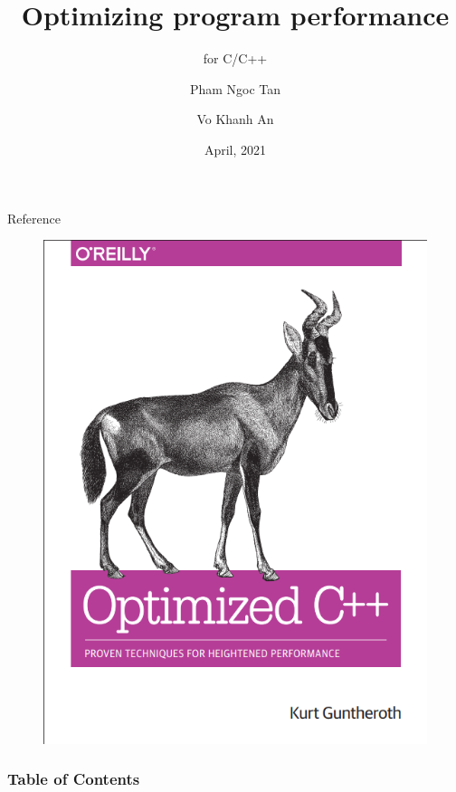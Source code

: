 \documentclass[aspectratio=169,xcolor=dvipsnames]{beamer}
\title[Optimizing C/C++]{Optimizing program performance}
\subtitle{for C/C++}
\author[Pham Ngoc Tan - Vo Khanh An]{Pham Ngoc Tan \and Vo Khanh An }
\institute[UIT] %
{
    Faculty of Computer Science \\
    University of Information Technology, VNU HCM 
    \vskip 3pt
}
\date{April, 2021} %
\begin{document}
\begin{frame}
    \titlepage
\end{frame}

\begin{frame}{Reference}
    \begin{figure}
        \centering
        \includegraphics[scale = 0.5]{OptimizedC.png}
        \label{fig:my_label}
    \end{figure}
\end{frame}

\begin{frame}
    \frametitle{Table of Contents}
    \tableofcontents[]
\end{frame}

\end{document}
